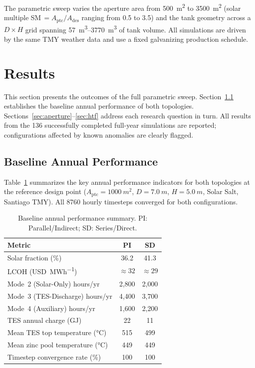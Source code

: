 \documentclass[11pt,review,3p]{elsarticle}
\begin{document}
The parametric sweep varies the aperture area from \SI{500}{m^2} to \SI{3500}{m^2} (solar multiple SM\,$=A_{\text{ptc}}/A_{\text{des}}$ ranging from 0.5 to 3.5) and the tank geometry across a $D \times H$ grid spanning \SIrange{57}{3770}{m^3} of tank volume. All simulations are driven by the same TMY weather data and use a fixed galvanizing production schedule.

\section{Results}
\label{sec:Results}

This section presents the outcomes of the full parametric sweep. Section~\ref{sec:baseline} establishes the baseline annual performance of both topologies. Sections~\ref{sec:aperture}--\ref{sec:htf} address each research question in turn. All results from the 136 successfully completed full-year simulations are reported; configurations affected by known anomalies are clearly flagged.

\subsection{Baseline Annual Performance}
\label{sec:baseline}

Table~\ref{tab:baseline} summarizes the key annual performance indicators for both topologies at the reference design point ($A_{\text{ptc}} = \SI{1000}{m^2}$, $D = \SI{7.0}{m}$, $H = \SI{5.0}{m}$, Solar Salt, Santiago TMY). All 8760 hourly timesteps converged for both configurations.

\begin{table}[h]
\centering
\caption{Baseline annual performance summary. PI: Parallel/Indirect; SD: Series/Direct.}
\label{tab:baseline}
\begin{tabular}{lcc}
\toprule
Metric & PI & SD \\
\midrule
Solar fraction (\%) & 36.2 & 41.3 \\
LCOH (\si{USD.MWh^{-1}}) & $\approx32$ & $\approx29$ \\
Mode~2 (Solar-Only) hours/yr & 2{,}800 & 2{,}000 \\
Mode~3 (TES-Discharge) hours/yr & 4{,}400 & 3{,}700 \\
Mode~4 (Auxiliary) hours/yr & 1{,}600 & 2{,}200 \\
TES annual charge (GJ) & 22 & 11 \\
Mean TES top temperature (\si{\celsius}) & 515 & 499 \\
Mean zinc pool temperature (\si{\celsius}) & 449 & 449 \\
Timestep convergence rate (\%) & 100 & 100 \\
\bottomrule
\end{tabular}
\end{table}
\end{document}
